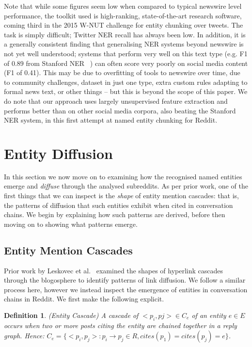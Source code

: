 \documentclass[sigconf]{acmart}
\newtheorem{mydef}{Definition}
\begin{document}
Note that while some figures seem low when compared to typical newswire level performance, the toolkit used is high-ranking, state-of-the-art research software, coming third in the 2015 W-NUT challenge for entity chunking over tweets.
The task is simply difficult; Twitter NER recall has always been low.
In addition, it is a generally consistent finding that generalising NER systems beyond newswire is not yet well understood; systems that perform very well on this text type (e.g. F1 of 0.89 from Stanford NER~\cite{derczynski2015analysis}%
) can often score very poorly on social media content (F1 of 0.41).
This may be due to overfitting of tools to newswire over time, due to community challenges, dataset in just one type, extra custom rules adapting to formal news text, or other things -- but this is beyond the scope of this paper.
We do note that our approach uses largely unsupervised feature extraction and performs better than on other social media corpora, also beating the Stanford NER system, in this first attempt at named entity chunking for Reddit.
\fi 

\section{Entity Diffusion}
\label{sec:diffusion}
In this section we now move on to examining how the recognised named entities emerge and \emph{diffuse} through the analysed subreddits.
As per prior work, one of the first things that we can inspect is the \emph{shape} of entity mention cascades: that is, the patterns of diffusion that such entities exhibit when cited in conversation chains. 
We begin by explaining how such patterns are derived, before then moving on to showing what patterns emerge.

\subsection{Entity Mention Cascades}
Prior work by Leskovec et al.~\cite{leskovec2007patterns} examined the shapes of hyperlink cascades through the blogosphere to identify patterns of link diffusion.
We follow a similar process here, however we instead inspect the emergence of entities in conversation chains in Reddit.
We first make the following explicit.

\begin{mydef}
(Entity Cascade) A cascade of ${<p_i, pj>} \in C_e$ of an entity $e \in E$ occurs when two or more posts citing the entity are chained together in a reply graph. 
Hence: $C_e = \{<p_i, p_j> : p_i \rightarrow p_j \in R, cites(p_1) = cites(p_j) = e\}$.
\end{mydef}
\end{document}

